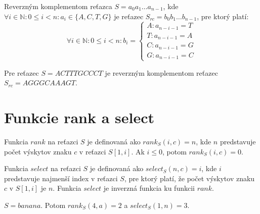 \bigskip

\begin{defn}
    \label{def:reverzny_komplement}
    Reverzným komplementom reťazca $S=a_0a_1 \ldots a_{n-1}$, kde \\
    $\forall i \in \mathbb{N} : 0 \leq i < n : a_i \in \{A, C, T, G\}$ je reťazec $S_{rc}=b_0b_1 \ldots b_{n-1}$, pre ktorý platí:
    $$
    \forall i \in \mathbb{N} : 0 \leq i < n : b_i = \begin{cases}
                                                        A : a_{n-i-1} = T \\
                                                        T : a_{n-i-1} = A \\
                                                        C : a_{n-i-1} = G \\
                                                        G : a_{n-i-1} = C  
                                                    \end{cases}
    $$
\end{defn}

\begin{example}
    Pre reťazec $S=ACTTTGCCCT$ je reverzným komplementom reťazec $S_{rc}=AGGGCAAAGT$.
\end{example}

    

\section{Funkcie rank a select}
\begin{defn}
    Funkcia $rank$ na reťazci $S$ je definovaná ako $rank_S(i, c) = n$, kde $n$
    predstavuje počet výskytov znaku $c$ v reťazci $S[1, i]$. Ak $i \leq 0$,
    potom $rank_S(i, c) = 0$.
\end{defn}

\begin{defn}
    Funkcia $select$ na reťazci $S$ je definovaná ako $select_S(n, c) = i$, kde
    $i$ predstavuje najmenší index v reťazci $S$, pre ktorý platí, že počet
    výskytov znaku $c$ v $S[1, i]$ je $n$. Funkcia $select$ je inverzná funkcia
    ku funkcii $rank$.
\end{defn}

\begin{example}
    $S = banana$. Potom $rank_S(4, a) = 2$ a $select_S(1, n) = 3$.
\end{example}

